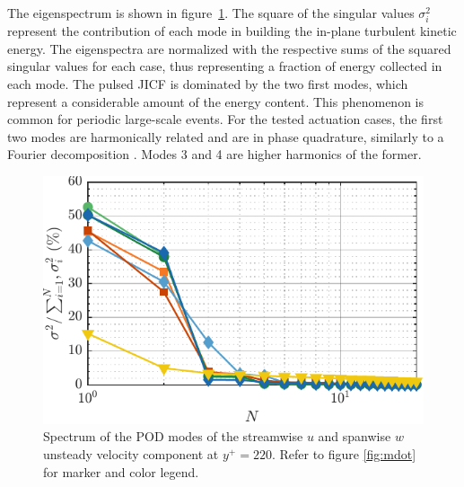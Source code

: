 The eigenspectrum is shown in figure~\ref{fig:POD_spectrum}. The square of the singular values $\sigma_i^2$ represent the contribution of each mode in building the in-plane turbulent kinetic energy. The eigenspectra are normalized with the respective sums of the squared singular values for each case, thus representing a fraction of energy collected in each mode. The pulsed JICF is dominated by the two first modes, which represent a considerable amount of the energy content. This phenomenon is common for periodic large-scale events. For the tested actuation cases, the first two modes are harmonically related and are in phase quadrature, similarly to a Fourier decomposition \citep{Raiola2016cylindertandem}. Modes 3 and 4 are higher harmonics of the former.

\begin{figure}[t] %
    \centering
    \includegraphics[width=0.7\linewidth]{figures/F11.pdf}
    \caption{Spectrum of the POD modes of the streamwise $u$ and spanwise $w$ unsteady velocity component at $y^+ = 220$. Refer to figure \ref{fig:mdot} for marker and color legend.}
    \label{fig:POD_spectrum}
\end{figure}

